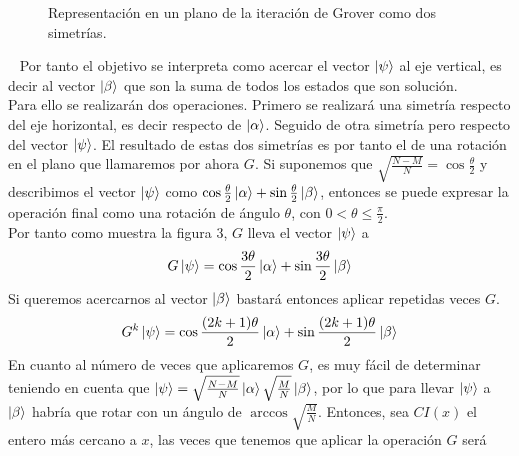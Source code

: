 \documentclass[a4paper]{article}
\numberwithin{equation}{section}
\begin{document}
\begin{figure}[h]
\caption{Representación en un plano de la iteración de Grover como dos simetrías.}
\end{figure}\ \linebreak
Por tanto el objetivo se interpreta como acercar el vector $\ket{\psi}$ al eje vertical, es decir al vector $\ket{\beta}$ que son la suma de todos los estados que son solución.\\
\linebreak
Para ello se realizarán dos operaciones. Primero se realizará una simetría respecto del eje horizontal, es decir respecto de $\ket{\alpha}$. Seguido de otra simetría pero respecto del vector $\ket{\psi}$. El resultado de estas dos simetrías es por tanto el de una rotación en el plano que llamaremos por ahora $G$. Si suponemos que $\sqrt{\frac{N-M}{N}} = \cos \frac{\theta}{2}$ y describimos el vector $\ket{\psi}$ como $\cos \frac{\theta}{2} \ket{\alpha} + \sin \frac{\theta}{2} \ket{\beta}$, entonces se puede expresar la operación final como una rotación de ángulo $\theta$, con $0<\theta\leq \frac{\pi}{2}$.\\
\linebreak
Por tanto como muestra la figura 3, $G$ lleva el vector $\ket{\psi}$ a
\begin{equation}
G\ket{\psi} = \cos \frac{3\theta}{2}\ket{\alpha} + \sin \frac{3\theta}{2} \ket{\beta}
\end{equation}
Si queremos acercarnos al vector $\ket{\beta}$ bastará entonces aplicar repetidas veces $G$.
\begin{equation}
G^k \ket{\psi} = \cos \frac{(2k+1)\theta}{2}\ket{\alpha} + \sin \frac{(2k+1)\theta}{2} \ket{\beta}
\end{equation}
En cuanto al número de veces que aplicaremos $G$, es muy fácil de determinar teniendo en cuenta que $\ket{\psi} = \sqrt{\frac{N-M}{N}}\ket{\alpha} \sqrt{\frac{M}{N}}\ket{\beta}$, por lo que para llevar $\ket{\psi}$ a $\ket{\beta}$ habría que rotar con un ángulo de $\arccos \sqrt{\frac{M}{N}}$. Entonces, sea $CI(x)$ el entero más cercano a $x$, las veces que tenemos que aplicar la operación $G$ será
\end{document}
